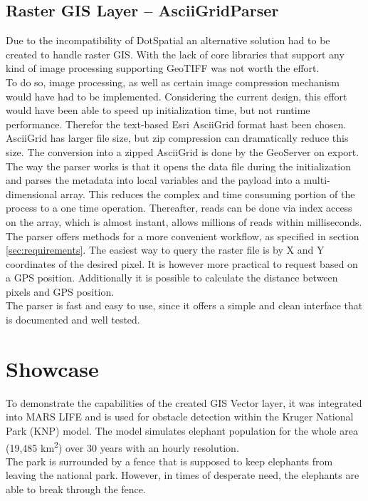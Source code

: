 \subsection{Raster GIS Layer -- AsciiGridParser}
\label{sec:parser}
Due to the incompatibility of DotSpatial an alternative solution had to be created to handle raster GIS. With the lack of core libraries that support any kind of image processing supporting GeoTIFF was not worth the effort.\\
To do so, image processing, as well as certain image compression mechanism would have had to be implemented. Considering the current design, this effort would have been able to speed up initialization time, but not runtime performance. Therefor the text-based Esri AsciiGrid format hast been chosen.\\
AsciiGrid has larger file size, but zip compression can dramatically reduce this size. The conversion into a zipped AsciiGrid is done by the GeoServer on export.\\
The way the parser works is that it opens the data file during the initialization and parses the metadata into local variables and the payload into a multi-dimensional array. This reduces the complex and time consuming portion of the process to a one time operation. Thereafter, reads can be done via index access on the array, which is almost instant, allows millions of reads within milliseconds.\\
The parser offers methods for a more convenient workflow, as specified in section \ref{sec:requirements}. The easiest way to query the raster file is by X and Y coordinates of the desired pixel. It is however more practical to request based on a GPS position. Additionally it is possible to calculate the distance between pixels and GPS position.\\
The parser is fast and easy to use, since it offers a simple and clean interface that is documented and well tested.


\section{Showcase}
To demonstrate the capabilities of the created GIS Vector layer, it was integrated into MARS LIFE and is used for obstacle detection within the Kruger National Park (KNP) model. The model simulates elephant population for the whole area (19,485 \si{km^{2}}) over 30 years with an hourly resolution.\\
The park is surrounded by a fence that is supposed to keep elephants from leaving the national park. However, in times of desperate need, the elephants are able to break through the fence.\\



